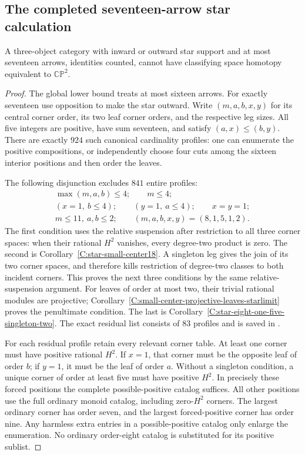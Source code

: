\subsection{The completed seventeen-arrow star calculation}

\begin{theorem}\label{C:seventeen-all-stars}
A three-object category with inward or outward star support and
at most seventeen arrows, identities counted, cannot have
classifying space homotopy equivalent to $\mathbb{CP}^2$.
\end{theorem}
\begin{proof}
The global lower bound treats at most sixteen arrows. For exactly
seventeen use opposition to make the star outward. Write
$(m,a,b,x,y)$ for its central corner order, its two leaf corner
orders, and the respective leg sizes. All five integers are
positive, have sum seventeen, and satisfy $(a,x)\leq(b,y)$.
There are exactly $924$ such canonical cardinality profiles:
one can enumerate the positive compositions, or independently
choose four cuts among the sixteen interior positions and then
order the leaves.

The following disjunction excludes $841$ entire profiles:
\[
\begin{gathered}
 \max(m,a,b)\leq4;\qquad m\leq4;\\
 (x=1,\ b\leq4);\qquad (y=1,\ a\leq4);
 \qquad x=y=1;\\
 m\leq11,\ a,b\leq2;\qquad
 (m,a,b,x,y)=(8,1,5,1,2).
\end{gathered}
\]
The first condition uses the relative suspension after restriction
to all three corner spaces: when their rational $H^2$ vanishes,
every degree-two product is zero. The second is
Corollary~\ref{C:star-small-center18}. A singleton leg gives
the join of its two corner spaces, and therefore kills restriction
of degree-two classes to both incident corners. This proves the
next three conditions by the same relative-suspension argument.
For leaves of order at most two, their trivial rational modules
are projective; Corollary~\ref{C:small-center-projective-leaves-starlimit}
proves the penultimate condition. The last is
Corollary~\ref{C:star-eight-one-five-singleton-two}.
The exact residual list consists of $83$ profiles and is saved in
.

For each residual profile retain every relevant corner table.
At least one corner must have positive rational $H^2$.
If $x=1$, that corner must be the opposite leaf of order $b$;
if $y=1$, it must be the leaf of order $a$.
Without a singleton condition, a unique corner of order at
least five must have positive $H^2$. In precisely these forced
positions the complete possible-positive catalog suffices.
All other positions use the full ordinary monoid catalog,
including zero-$H^2$ corners. The largest ordinary corner has
order seven, and the largest forced-positive corner has order
nine. Any harmless extra entries in a possible-positive catalog
only enlarge the enumeration. No ordinary order-eight catalog
is substituted for its positive sublist.


\end{proof}
